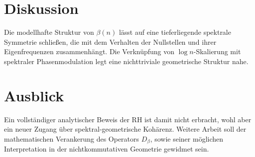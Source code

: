 \documentclass[11pt]{article}
\begin{document}
\section{Diskussion}
Die modellhafte Struktur von \(\beta(n)\) lässt auf eine tieferliegende spektrale Symmetrie schließen, die mit dem Verhalten der Nullstellen und ihrer Eigenfrequenzen zusammenhängt. Die Verknüpfung von \(\log n\)-Skalierung mit spektraler Phasenmodulation legt eine nichttriviale geometrische Struktur nahe.

\section{Ausblick}
Ein vollständiger analytischer Beweis der RH ist damit nicht erbracht, wohl aber ein neuer Zugang über spektral-geometrische Kohärenz. Weitere Arbeit soll der mathematischen Verankerung des Operators \(D_\beta\), sowie seiner möglichen Interpretation in der nichtkommutativen Geometrie gewidmet sein.
\end{document}
